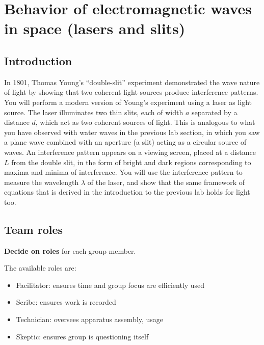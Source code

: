 \chapter{Behavior of electromagnetic waves in space (lasers and slits)}


\section{Introduction}

In 1801, Thomas Young's ``double-slit'' experiment demonstrated the wave nature of light by showing that two coherent light sources produce interference patterns. You will perform a modern version of Young's experiment using a
laser as light source. The laser illuminates two thin slits, each of width $a$ separated by a distance $d$, which act as two
coherent sources of light. This is analogous to what you have observed with water waves in the previous lab section, in
which you saw a plane wave combined with an aperture (a slit) acting as a circular source of waves. An interference
pattern appears on a viewing screen, placed at a distance $L$ from the double slit, in the form of bright and dark regions
corresponding to maxima and minima of interference. You will use the interference pattern to measure the wavelength
$\lambda$ of the laser, and show that the same framework of equations that is derived in the introduction to the previous lab
holds for light too.

\section{Team roles}

\begin{steps}
	\item \textbf{Decide on roles} for each group member.
\end{steps}

The available roles are:

\begin{itemize}
	\item Facilitator: ensures time and group focus are efficiently used
	\item Scribe: ensures work is recorded
	\item Technician: oversees apparatus assembly, usage
	\item Skeptic: ensures group is questioning itself
\end{itemize}

